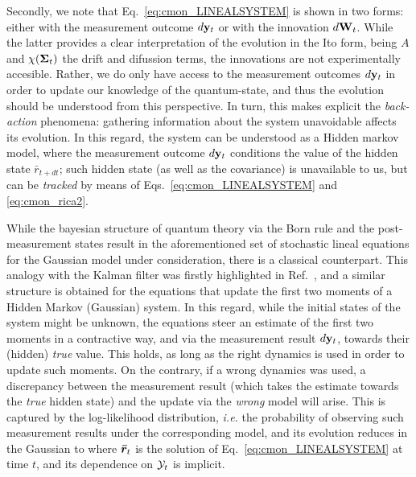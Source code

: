 Secondly, we note that Eq.~\ref{eq:cmon_LINEALSYSTEM} is shown in two forms: either with the measurement outcome $d\mathbf{y}_t$ or with the innovation $d\mathbf{W}_t$. While the latter provides a clear interpretation of the evolution in the Ito form, being $A$ and $\chi(\bm{\Sigma}_t)$ the drift and difussion terms, the innovations are not experimentally accesible. Rather, we do only have access to the measurement outcomes $d\mathbf{y}_t$ in order to update our knowledge of the quantum-state, and thus the evolution should be understood from this perspective. In turn, this makes explicit the \textit{back-action} phenomena: gathering information about the system unavoidable affects its evolution. In this regard, the system can be understood as a Hidden markov model, where the measurement outcome $d\mathbf{y}_t$ conditions the value of the hidden state $\bar{r}_{t+dt}$; such hidden state (as well as the covariance) is unavailable to us, but can be \textit{tracked}
by means of Eqs.~\ref{eq:cmon_LINEALSYSTEM} and \ref{eq:cmon_rica2}.

While the bayesian structure of quantum theory via the Born rule and the post-measurement states result in the aforementioned set of stochastic lineal equations for the Gaussian model under consideration, there is a classical counterpart. This analogy with the Kalman filter was firstly highlighted in Ref.~\cite{doherty1999feedback}, and a similar structure is obtained for the equations that update the first two moments of a Hidden Markov (Gaussian) system. In this regard, while the initial states of the system might be unknown, the equations steer an estimate of the first two moments in a contractive way, and via the measurement result $d\mathbf{y}_t$, towards their (hidden) \textit{true} value. This holds, as long as the right dynamics is used in order to update such moments. On the contrary, if a wrong dynamics was used, a discrepancy between the measurement result (which takes the estimate towards the \textit{true} hidden state) and the update via the \textit{wrong} model will arise. This is captured by the log-likelihood distribution, \textit{i.e.} the probability of observing such measurement results under the corresponding model, and its evolution reduces in the Gaussian to
where $\bm{\bar{r}}_t$ is the solution of Eq.~\ref{eq:cmon_LINEALSYSTEM} at time $t$, and its dependence on $\mathcal{Y}_t$ is implicit.

